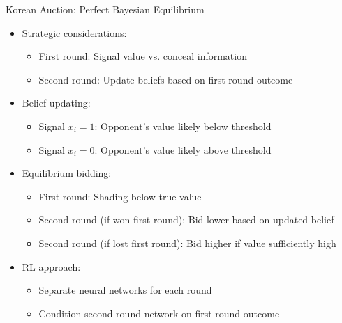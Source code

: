 \documentclass[10pt]{beamer}
\begin{document}
\begin{frame}{Korean Auction: Perfect Bayesian Equilibrium}
    \begin{itemize}
        \item Strategic considerations:
        \begin{itemize}
            \item First round: Signal value vs. conceal information
            \item Second round: Update beliefs based on first-round outcome
        \end{itemize}
        \vspace{0.2cm}
        \item Belief updating:
        \begin{itemize}
            \item Signal $x_i = 1$: Opponent's value likely below threshold
            \item Signal $x_i = 0$: Opponent's value likely above threshold
        \end{itemize}
        \vspace{0.2cm}
        \item Equilibrium bidding:
        \begin{itemize}
            \item First round: Shading below true value
            \item Second round (if won first round): Bid lower based on updated belief
            \item Second round (if lost first round): Bid higher if value sufficiently high
        \end{itemize}
        \vspace{0.2cm}
        \item RL approach:
        \begin{itemize}
            \item Separate neural networks for each round
            \item Condition second-round network on first-round outcome
        \end{itemize}
    \end{itemize}
\end{frame}

\end{document}
